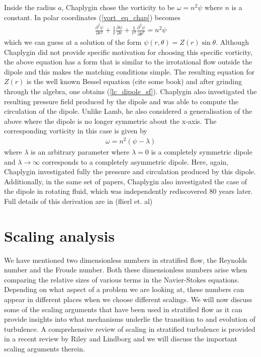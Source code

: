 Inside the radius $a$, Chaplygin chose the vorticity to be $\omega = n^{2}\psi$ where $n$ is a constant. In polar coordinates (\ref{vort_eq_chap}) becomes
\begin{align}
\frac{\partial^{2}\psi}{\partial r^{2}} + \frac{1}{r}\frac{\partial \psi}{\partial r} + \frac{1}{r^{2}}\frac{\partial^{2}\psi}{\partial \theta^{2}} =  n^{2}\psi
\end{align}
which we can guess at a solution of the form $\psi(r,\theta) = Z(r)\sin\theta$. Although Chaplygin did not provide specific motivation for choosing this specific vorticity, the above equation has a form that is similar to the irrotational flow outside the dipole and this makes the matching conditions simple. The resulting equation for $Z(r)$ is the well known Bessel equation (cite some book) and after grinding through the algebra, one obtains (\ref{lc_dipole_sf}). Chaplygin also investigated the resulting pressure field produced by the dipole and was able to compute the circulation of the dipole. Unlike Lamb, he also considered a generalisation of the above where the dipole is no longer symmetric about the x-axis. The corresponding vorticity in this case is given by
\begin{align}
\omega = n^{2}(\psi - \lambda)
\end{align}
where $\lambda$ is an arbitrary parameter where $\lambda=0$ is a completely symmetric dipole and $\lambda\rightarrow\infty$ corresponds to a completely asymmetric dipole. Here, again, Chaplygin investigated fully the pressure and circulation produced by this dipole. Additionally, in the same set of papers, Chaplygin also investigated the case of the dipole in rotating fluid, which was independently rediscovered 80 years later. Full details of this derivation are in \cite{meleshko1994} (flierl et. al) 


\section{Scaling analysis}
We have mentioned two dimensionless numbers in stratified flow, the Reynolds number and the Froude number. Both these dimensionless numbers arise when comparing the relative sizes of various terms in the Navier-Stokes equations. Depending on what aspect of a problem we are looking at, these numbers can appear in different places when we choose different scalings. We will now discuss some of the scaling arguments that have been used in stratified flow as it can provide insights into what mechanisms underlie the transition to and evolution of turbulence. A comprehensive review of scaling in stratified turbulence is provided in a recent review by Riley and Lindborg \cite{rileylindborg2013} and we will discuss the important scaling arguments therein. 

